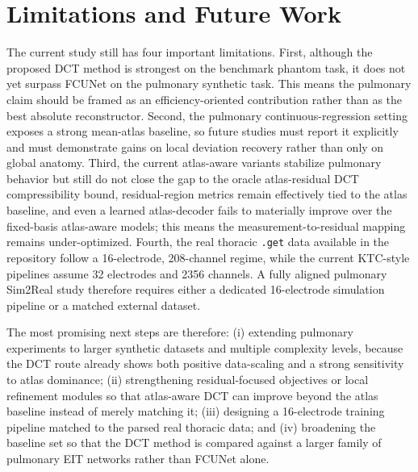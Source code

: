\documentclass[11pt,a4paper]{article}
\begin{document}
\section{Limitations and Future Work}
The current study still has four important limitations. First, although the proposed DCT method is strongest on the benchmark phantom task, it does not yet surpass FCUNet on the pulmonary synthetic task. This means the pulmonary claim should be framed as an efficiency-oriented contribution rather than as the best absolute reconstructor. Second, the pulmonary continuous-regression setting exposes a strong mean-atlas baseline, so future studies must report it explicitly and must demonstrate gains on local deviation recovery rather than only on global anatomy. Third, the current atlas-aware variants stabilize pulmonary behavior but still do not close the gap to the oracle atlas-residual DCT compressibility bound, residual-region metrics remain effectively tied to the atlas baseline, and even a learned atlas-decoder fails to materially improve over the fixed-basis atlas-aware models; this means the measurement-to-residual mapping remains under-optimized. Fourth, the real thoracic \texttt{.get} data available in the repository follow a 16-electrode, 208-channel regime, while the current KTC-style pipelines assume 32 electrodes and 2356 channels. A fully aligned pulmonary Sim2Real study therefore requires either a dedicated 16-electrode simulation pipeline or a matched external dataset.

The most promising next steps are therefore: (i) extending pulmonary experiments to larger synthetic datasets and multiple complexity levels, because the DCT route already shows both positive data-scaling and a strong sensitivity to atlas dominance; (ii) strengthening residual-focused objectives or local refinement modules so that atlas-aware DCT can improve beyond the atlas baseline instead of merely matching it; (iii) designing a 16-electrode training pipeline matched to the parsed real thoracic data; and (iv) broadening the baseline set so that the DCT method is compared against a larger family of pulmonary EIT networks rather than FCUNet alone.
\end{document}
